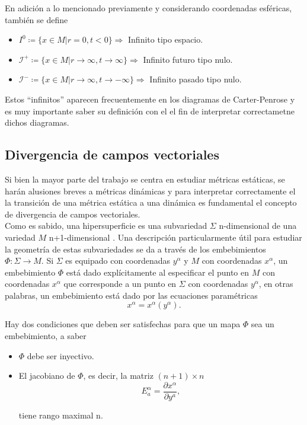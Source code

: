 \documentclass[16pt,a4paper]{article}
\numberwithin{equation}{section}
\theoremstyle{definition}
\begin{document}
En adición a lo mencionado previamente y considerando coordenadas esféricas, también se define \cite{gravitation}
\begin{itemize}
	\item $I^0 \coloneqq \{x \in M | r = 0, t <0\} \Rightarrow$ Infinito tipo espacio.
	\item $\mathscr{I}^+ \coloneqq \{ x \in M | r \to \infty, t \to \infty\} \Rightarrow$ Infinito futuro tipo nulo.
	\item $\mathscr{I}^- \coloneqq \{ x \in M | r \to \infty, t \to -\infty\} \Rightarrow$ Infinito pasado tipo nulo.
\end{itemize}

Estos ``infinitos'' aparecen frecuentemente en los diagramas de Carter-Penrose y es muy importante saber su definición con el el fin de interpretar correctametne dichos diagramas.

\subsection{Divergencia de campos vectoriales}

Si bien la mayor parte del trabajo se centra en estudiar métricas estáticas, se harán alusiones breves a métricas dinámicas y para interpretar correctamente el la transición de una métrica estática a una dinámica es fundamental el concepto de divergencia de campos vectoriales.\\

Como es sabido, una hipersuperficie es una subvariedad $\Sigma$ n-dimensional de una variedad $M$ n+1-dimensional \cite{blau}. Una descripción particularmente útil para estudiar la geometría de estas subvariedades se da a través de los embebimientos $\Phi: \Sigma \to M$. Si $\Sigma$ es equipado con coordenadas $y^\alpha$ y $M$ con coordenadas $x^\alpha$, un embebimiento $\Phi$ está dado explícitamente al especificar el punto en $M$ con coordenadas $x^\alpha$ que corresponde a un punto en $\Sigma$ con coordenadas $y^\alpha$, en otras palabras, un embebimiento está dado por las ecuaciones paramétricas 
\begin{equation*}
x^\alpha = x^\alpha(y^\alpha).
\end{equation*}

Hay dos condiciones que deben ser satisfechas para que un mapa $\Phi$ sea un embebimiento, a saber
\begin{itemize}
	\item $\Phi$ debe ser inyectivo.
	\item El jacobiano de $\Phi$, es decir, la matriz $(n+1)\times n$
	\begin{equation*}
	E^{\alpha}_{a} = \frac{\partial x^\alpha}{\partial y^a},
	\end{equation*}
	
	tiene rango maximal n.
\end{itemize}
\end{document}
